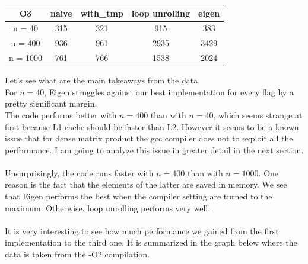\documentclass[11pt,a4paper,oneside,titlepage,openright]{book}
\begin{document}
\begin{center}
 \begin{tabular}{|c c c c c |} 
 \hline
 O3 & naive & with\_tmp & loop unrolling & eigen \\ [0.5ex] 
 \hline
 n = 40 & 315 & 321 & 915  & 383\\ 
 \hline
 n = 400 & 936 & 961 & 2935 & 3429\\
 \hline
 n = 1000 & 761 & 766 & 1538 & 2024\\
 \hline
\end{tabular}
\end{center}
Let's see what are the main takeaways from the data.\\
For $n = 40$, Eigen struggles against our best implementation for every flag by a pretty significant margin. \\
The code performs better with $n = 400$ than with $n = 40$, which seems strange at first because L1 cache should be faster than L2. However it seems to be a known issue that for dense matrix product the gcc compiler does not to exploit all the performance. I am going to analyze this issue in greater detail in the next section.\\\\
Unsurprisingly, the code runs faster with $n = 400$ than with $n = 1000$. One reason is the fact that the elements of the latter are saved in memory. 
We see that Eigen performs the best when the compiler setting are turned to the maximum. Otherwise, loop unrolling performs very well.\\\\ 
It is very interesting to see how much performance we gained from the first implementation to the third one. It is summarized in the graph below where the data is taken from the -O2 compilation.
\end{document}
